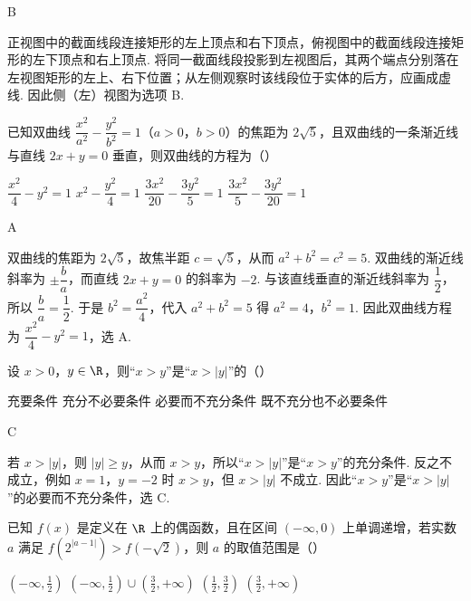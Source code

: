 \begin{answer}
B
\end{answer}

\begin{solution}
正视图中的截面线段连接矩形的左上顶点和右下顶点，俯视图中的截面线段连接矩形的左下顶点和右上顶点. 将同一截面线段投影到左视图后，其两个端点分别落在左视图矩形的左上、右下位置；从左侧观察时该线段位于实体的后方，应画成虚线. 因此侧（左）视图为选项 B.
\end{solution}

\begin{problem}
已知双曲线 \( \dfrac{x^2}{a^2}-\dfrac{y^2}{b^2}=1 \)（\(a>0\)，\(b>0\)）的焦距为 \( 2\sqrt5 \)，且双曲线的一条渐近线与直线 \( 2x+y=0 \) 垂直，则双曲线的方程为（\quad）

\choices
    {\(\dfrac{x^2}{4}-y^2=1\)}
    {\(x^2-\dfrac{y^2}{4}=1\)}
    {\(\dfrac{3x^2}{20}-\dfrac{3y^2}{5}=1\)}
    {\(\dfrac{3x^2}{5}-\dfrac{3y^2}{20}=1\)}
\end{problem}

\begin{answer}
A
\end{answer}

\begin{solution}
双曲线的焦距为 \(2\sqrt5\)，故焦半距 \(c=\sqrt5\)，从而
\(a^2+b^2=c^2=5\). 双曲线的渐近线斜率为 \(\pm\dfrac ba\)，而直线
\(2x+y=0\) 的斜率为 \(-2\). 与该直线垂直的渐近线斜率为 \(\dfrac12\)，所以
\(\dfrac ba=\dfrac12\). 于是 \(b^2=\dfrac{a^2}{4}\)，代入
\(a^2+b^2=5\) 得 \(a^2=4\)，\(b^2=1\). 因此双曲线方程为
\(\dfrac{x^2}{4}-y^2=1\)，选 A.
\end{solution}

\begin{problem}
设 \(x>0\)，\(y\in \R\)，则“\( x>y \)”是“\( x>|y| \)”的（\quad）

\choices
    {充要条件}
    {充分不必要条件}
    {必要而不充分条件}
    {既不充分也不必要条件}
\end{problem}

\begin{answer}
C
\end{answer}

\begin{solution}
若 \(x>|y|\)，则 \(|y|\geqslant y\)，从而 \(x>y\)，所以“\(x>|y|\)”是“\(x>y\)”的充分条件.
反之不成立，例如 \(x=1\)，\(y=-2\) 时 \(x>y\)，但 \(x>|y|\) 不成立. 因此“\(x>y\)”是“\(x>|y|\)”的必要而不充分条件，选 C.
\end{solution}

\begin{problem}
已知 \( f(x) \) 是定义在 \( \R \) 上的偶函数，且在区间 \( \left( -\infty,0 \right) \) 上单调递增，若实数 \( a \) 满足 \( f\left( 2^{|a-1|} \right)>f\left( -\sqrt2 \right) \)，则 \( a \) 的取值范围是（\quad）

\choices
    {\(\left( -\infty,\frac12 \right)\)}
    {\(\left( -\infty,\frac12 \right)\cup\left( \frac32,+\infty \right)\)}
    {\(\left( \frac12,\frac32 \right)\)}
    {\(\left( \frac32,+\infty \right)\)}
\end{problem}

